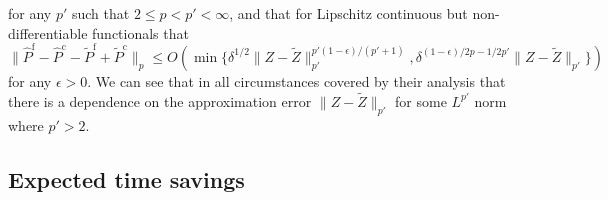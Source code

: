 \documentclass[manuscript,review]{acmart}
\begin{document}
for any  $ p' $ such that $ 2 \leq p < p' < \infty $, and that for Lipschitz continuous but non-differentiable functionals that 
\begin{equation*}
\lVert \widehat{P}^{\mathrm{f}} - \widehat{P}^{\mathrm{c}} - \widetilde{P}^{\mathrm{f}} + \widetilde{P}^{\mathrm{c}}\rVert_p 
\leq O(\min\{
\delta^{1/2} \lVert Z - \widetilde{Z} \rVert_{p'}^{p'(1-\epsilon)/(p'+1)},
\delta^{(1-\epsilon)/2p -1/2p'}    \lVert Z - \widetilde{Z} \rVert_{p'}
\})
\end{equation*}
for any  $ \epsilon > 0 $. We can see that in all circumstances covered by their analysis that there is a dependence on the approximation error $  \lVert Z - \widetilde{Z} \rVert_{p'} $ for some $ L^{p'} $ norm where $ p' > 2 $.

\subsection{Expected time savings}
\end{document}
